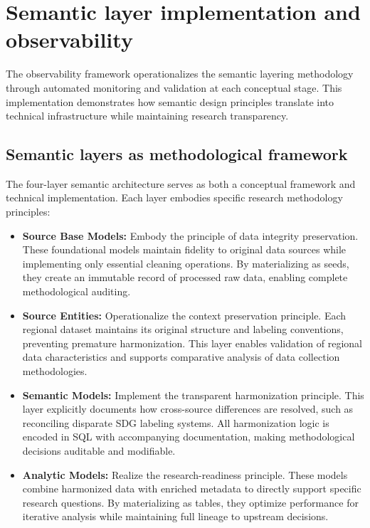 \documentclass{article}
\begin{document}
\section{Semantic layer implementation and observability}
\label{sec:semantic-implementation}

The observability framework operationalizes the semantic layering methodology through automated monitoring and validation at each conceptual stage. This implementation demonstrates how semantic design principles translate into technical infrastructure while maintaining research transparency.

\subsection{Semantic layers as methodological framework}
\label{subsec:semantic-layers}

The four-layer semantic architecture serves as both a conceptual framework and technical implementation. Each layer embodies specific research methodology principles:

\begin{itemize}
    \item \textbf{Source Base Models:} Embody the principle of data integrity preservation. These foundational models maintain fidelity to original data sources while implementing only essential cleaning operations. By materializing as seeds, they create an immutable record of processed raw data, enabling complete methodological auditing.

    \item \textbf{Source Entities:} Operationalize the context preservation principle. Each regional dataset maintains its original structure and labeling conventions, preventing premature harmonization. This layer enables validation of regional data characteristics and supports comparative analysis of data collection methodologies.
    
    \item \textbf{Semantic Models:} Implement the transparent harmonization principle. This layer explicitly documents how cross-source differences are resolved, such as reconciling disparate SDG labeling systems. All harmonization logic is encoded in SQL with accompanying documentation, making methodological decisions auditable and modifiable.
    
    \item \textbf{Analytic Models:} Realize the research-readiness principle. These models combine harmonized data with enriched metadata to directly support specific research questions. By materializing as tables, they optimize performance for iterative analysis while maintaining full lineage to upstream decisions.
\end{itemize}
\end{document}
